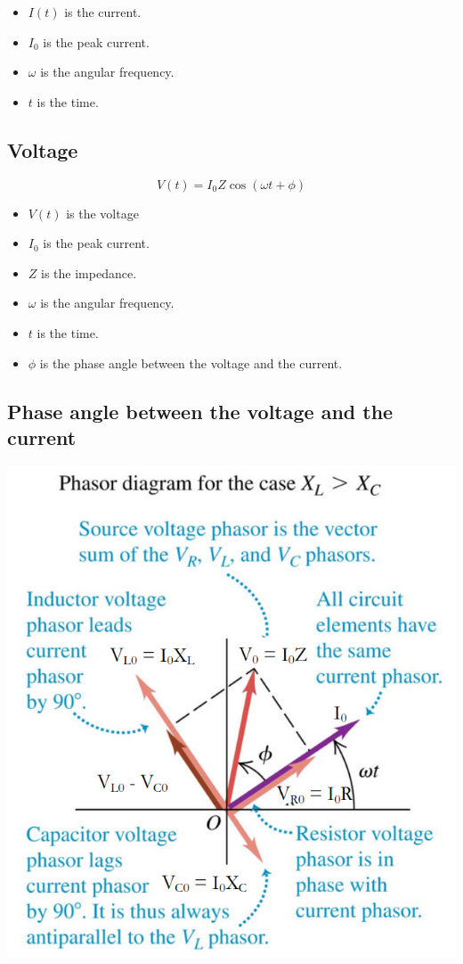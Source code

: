 \documentclass[11pt]{article}
\begin{document}
\begin{itemize}
\item \(I(t)\) is the current.
\item \(I_0\) is the peak current.
\item \(\omega\) is the angular frequency.
\item \(t\) is the time.
\end{itemize}

\subsection{Voltage}
\label{sec:org013a523}
\[V(t) = I_0 Z \cos (\omega t + \phi)\]

\begin{itemize}
\item \(V(t)\) is the voltage
\item \(I_0\) is the peak current.
\item \(Z\) is the impedance.
\item \(\omega\) is the angular frequency.
\item \(t\) is the time.
\item \(\phi\) is the phase angle between the voltage and the current.
\end{itemize}

\newpage

\subsection{Phase angle between the voltage and the current}
\label{sec:org8f3d702}
\begin{center}
\includegraphics[width=.9\linewidth]{./images/rcl-circuit-phasor-diagram-phase-angle.png}
\end{center}
\end{document}
